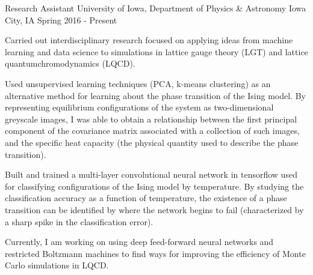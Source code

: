 
\begin{cventries}

  \cventry
  {Research Assistant} %
  {University of Iowa, Department of Physics \& Astronomy} %
  {Iowa City, IA} %
  {Spring 2016 - Present} %
  {
      \begin{cvitems} %
          \item {Carried out interdisciplinary research focused on applying
                  ideas from machine learning and data science to simulations in
                  lattice gauge theory (LGT) and lattice quantumchromodynamics 
                  (LQCD).}
          \item {Used unsupervised learning techniques (PCA, k-means
                  clustering) as an alternative method for learning about the
                  phase transition of the Ising model. By representing
                  equilibrium configurations of the system as two-dimensional
                  greyscale images, I was able to obtain a relationship between
                  the first principal component of the covariance matrix
                  associated with a collection of such images, and the specific
                  heat capacity (the physical quantity used to describe the
                  phase transition).}
          \item {Built and trained a multi-layer convolutional neural network
                  in tensorflow used for classifying configurations of the Ising
                  model by temperature. By studying the classification
                  accuracy as a function of temperature, the existence of a
                  phase transition can be identified by where the network
                  begins to fail (characterized by a sharp spike in the
                  classification error).}
          \item {Currently, I am working on using deep feed-forward neural
                  networks and restricted Boltzmann machines to find ways for  
                  improving the efficiency of Monte Carlo simulations in LQCD.}
      \end{cvitems}
  }
\end{cventries}




